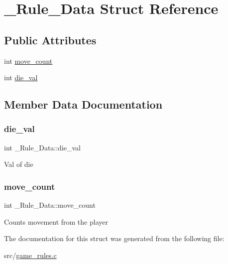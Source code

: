\hypertarget{struct__Rule__Data}{}\section{\+\_\+\+Rule\+\_\+\+Data Struct Reference}
\label{struct__Rule__Data}
\subsection*{Public Attributes}
\begin{DoxyCompactItemize}
\item 
int \hyperlink{struct__Rule__Data_a466ca76290157c9f892c0b3d1990b71b}{move\+\_\+count}
\item 
int \hyperlink{struct__Rule__Data_a2120d4ccd8394d1c824d39efd12b5b3d}{die\+\_\+val}
\end{DoxyCompactItemize}


\subsection{Member Data Documentation}
\mbox{\label{struct__Rule__Data_a2120d4ccd8394d1c824d39efd12b5b3d}} 
\subsubsection{\texorpdfstring{die\+\_\+val}{die\_val}}
{\footnotesize\ttfamily int \+\_\+\+Rule\+\_\+\+Data\+::die\+\_\+val}

Val of die \mbox{\label{struct__Rule__Data_a466ca76290157c9f892c0b3d1990b71b}} 
\subsubsection{\texorpdfstring{move\+\_\+count}{move\_count}}
{\footnotesize\ttfamily int \+\_\+\+Rule\+\_\+\+Data\+::move\+\_\+count}

Counts movement from the player 

The documentation for this struct was generated from the following file\+:\begin{DoxyCompactItemize}
\item 
src/\hyperlink{game__rules_8c}{game\+\_\+rules.\+c}\end{DoxyCompactItemize}

